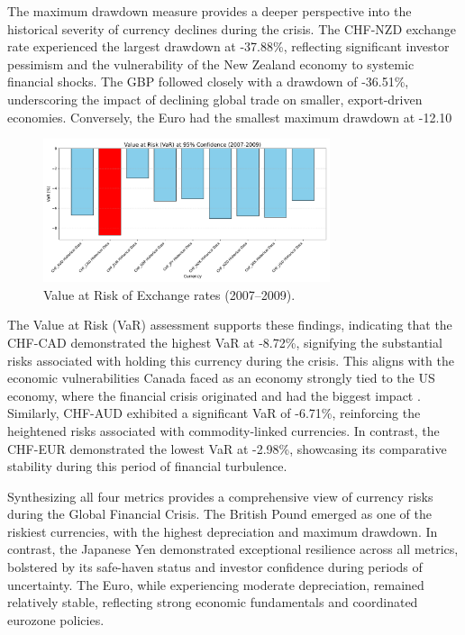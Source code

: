 \documentclass[11pt,a4paper,english,oneside]{book}
\begin{document}
The maximum drawdown measure provides a deeper perspective into the historical severity of currency declines during the crisis. The CHF-NZD exchange rate experienced the largest drawdown at -37.88\%, reflecting significant investor pessimism and the vulnerability of the New Zealand economy to systemic financial shocks. The GBP followed closely with a drawdown of -36.51\%, underscoring the impact of declining global trade on smaller, export-driven economies. Conversely, the Euro had the smallest maximum drawdown at -12.10%

\begin{figure}[h!]
    \centering
    \includegraphics[width=0.75\textwidth]{../../images/var_2007_2009.pdf}
    \caption{Value at Risk of Exchange rates (2007--2009).}
    \label{fig:var_2007_2009}
\end{figure}

The Value at Risk (VaR) assessment supports these findings, indicating that the CHF-CAD demonstrated the highest VaR at -8.72\%, signifying the substantial risks associated with holding this currency during the crisis. This aligns with the economic vulnerabilities Canada faced as an economy strongly tied to the US economy, where the financial crisis originated and had the biggest impact \parencite{claessens2010cross}. Similarly, CHF-AUD exhibited a significant VaR of -6.71\%, reinforcing the heightened risks associated with commodity-linked currencies. In contrast, the CHF-EUR demonstrated the lowest VaR at -2.98\%, showcasing its comparative stability during this period of financial turbulence.

Synthesizing all four metrics provides a comprehensive view of currency risks during the Global Financial Crisis. The British Pound emerged as one of the riskiest currencies, with the highest depreciation and maximum drawdown. In contrast, the Japanese Yen demonstrated exceptional resilience across all metrics, bolstered by its safe-haven status and investor confidence during periods of uncertainty. The Euro, while experiencing moderate depreciation, remained relatively stable, reflecting strong economic fundamentals and coordinated eurozone policies.
\end{document}
